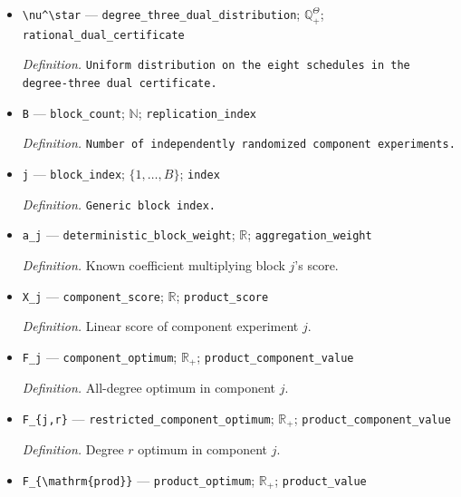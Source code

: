 \documentclass{article}
\begin{document}
\begin{itemize}
  \item \texttt{\textbackslash{}\allowbreak{}nu\textasciicircum{}\textbackslash{}\allowbreak{}star} --- \texttt{degree\_\allowbreak{}three\_\allowbreak{}dual\_\allowbreak{}distribution}; \(\mathbb Q_+^\Theta\); \texttt{rational\_\allowbreak{}dual\_\allowbreak{}certificate}
  \par\smallskip\noindent\emph{Definition.} \texttt{Uniform distribution on the eight schedules in the degree-\allowbreak{}three dual certificate.}
  \item \texttt{B} --- \texttt{block\_\allowbreak{}count}; \(\mathbb N\); \texttt{replication\_\allowbreak{}index}
  \par\smallskip\noindent\emph{Definition.} \texttt{Number of independently randomized component experiments.}
  \item \texttt{j} --- \texttt{block\_\allowbreak{}index}; \(\{1,\ldots,B\}\); \texttt{index}
  \par\smallskip\noindent\emph{Definition.} \texttt{Generic block index.}
  \item \texttt{a\_\allowbreak{}j} --- \texttt{deterministic\_\allowbreak{}block\_\allowbreak{}weight}; \(\mathbb R\); \texttt{aggregation\_\allowbreak{}weight}
  \par\smallskip\noindent\emph{Definition.} Known coefficient multiplying block \(j\)'s score.
  \item \texttt{X\_\allowbreak{}j} --- \texttt{component\_\allowbreak{}score}; \(\mathbb R\); \texttt{product\_\allowbreak{}score}
  \par\smallskip\noindent\emph{Definition.} Linear score of component experiment \(j\).
  \item \texttt{F\_\allowbreak{}j} --- \texttt{component\_\allowbreak{}optimum}; \(\mathbb R_+\); \texttt{product\_\allowbreak{}component\_\allowbreak{}value}
  \par\smallskip\noindent\emph{Definition.} All-degree optimum in component \(j\).
  \item \texttt{F\_\allowbreak{}\{j,\allowbreak{}r\}\allowbreak{}} --- \texttt{restricted\_\allowbreak{}component\_\allowbreak{}optimum}; \(\mathbb R_+\); \texttt{product\_\allowbreak{}component\_\allowbreak{}value}
  \par\smallskip\noindent\emph{Definition.} Degree \(r\) optimum in component \(j\).
  \item \texttt{F\_\allowbreak{}\{\textbackslash{}\allowbreak{}mathrm\{prod\}\allowbreak{}\}\allowbreak{}} --- \texttt{product\_\allowbreak{}optimum}; \(\mathbb R_+\); \texttt{product\_\allowbreak{}value}

\end{itemize}
\end{document}
